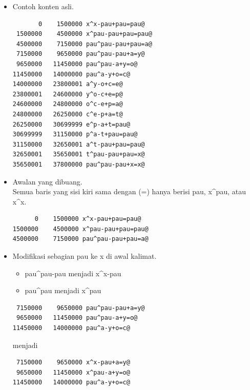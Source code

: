 \documentclass[12pt,]{article}
\begin{document}
	\begin{itemize}
		\item Contoh konten asli.
		\begin{verbatim}
       0    1500000 x^x-pau+pau=pau@
 1500000    4500000 x^pau-pau+pau=pau@
 4500000    7150000 pau^pau-pau+pau=a@
 7150000    9650000 pau^pau-pau+a=y@
 9650000   11450000 pau^pau-a+y=o@
11450000   14000000 pau^a-y+o=c@
14000000   23800001 a^y-o+c=e@
23800001   24600000 y^o-c+e=p@
24600000   24800000 o^c-e+p=a@
24800000   26250000 c^e-p+a=t@
26250000   30699999 e^p-a+t=pau@
30699999   31150000 p^a-t+pau=pau@
31150000   32650001 a^t-pau+pau=pau@
32650001   35650001 t^pau-pau+pau=x@
35650001   37800000 pau^pau-pau+x=x@
		\end{verbatim}

		\item Awalan yang dibuang.\\
		Semua baris yang sisi kiri sama dengan (=) hanya berisi pau, x\textasciicircum pau, atau x\textasciicircum x.
		\begin{verbatim}
      0    1500000 x^x-pau+pau=pau@
1500000    4500000 x^pau-pau+pau=pau@
4500000    7150000 pau^pau-pau+pau=a@
		\end{verbatim}

		\item Modifikasi sebagian pau ke x di awal kalimat.\\
		\begin{itemize}
			\item pau\textasciicircum pau-pau menjadi x\textasciicircum x-pau
			\item pau\textasciicircum pau menjadi x\textasciicircum pau
		\end{itemize}

		\begin{verbatim}
 7150000    9650000 pau^pau-pau+a=y@
 9650000   11450000 pau^pau-a+y=o@
11450000   14000000 pau^a-y+o=c@
		\end{verbatim}

		menjadi

		\begin{verbatim}
 7150000    9650000 x^x-pau+a=y@
 9650000   11450000 x^pau-a+y=o@
11450000   14000000 pau^a-y+o=c@
		\end{verbatim}


\end{itemize}
\end{document}
